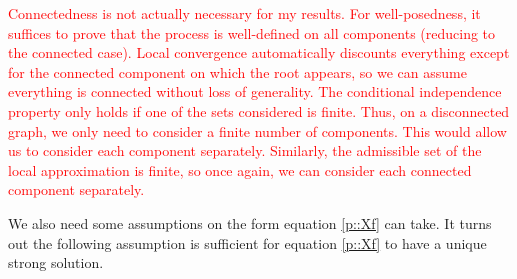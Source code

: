 \documentclass[12pt]{article}
\newcommand{\tr}{\textcolor{red}}
\newcommand{\ind}{\hspace{24pt}}
\begin{document}
\ind \tr{Connectedness is not actually necessary for my results. For well-posedness, it suffices to prove that the process is well-defined on all components (reducing to the connected case). Local convergence automatically discounts everything except for the connected component on which the root appears, so we can assume everything is connected without loss of generality. The conditional independence property only holds if one of the sets considered is finite. Thus, on a disconnected graph, we only need to consider a finite number of components. This would allow us to consider each component separately. Similarly, the admissible set of the local approximation is finite, so once again, we can consider each connected component separately.}

We also need some assumptions on the form equation \eqref{p::Xf} can take. It turns out the following assumption is sufficient for equation \eqref{p::Xf} to have a unique strong solution.
\end{document}
